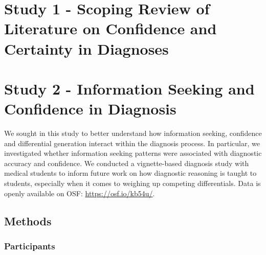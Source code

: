 \documentclass[a4paper, nobind]{templates/ociamthesis}
\begin{document}
\hypertarget{study-1---scoping-review-of-literature-on-confidence-and-certainty-in-diagnoses}{%
\chapter*{Study 1 - Scoping Review of Literature on Confidence and Certainty in Diagnoses}\label{study-1---scoping-review-of-literature-on-confidence-and-certainty-in-diagnoses}}

\adjustmtc
{}

\hypertarget{study-2---information-seeking-and-confidence-in-diagnosis}{%
\chapter*{Study 2 - Information Seeking and Confidence in Diagnosis}\label{study-2---information-seeking-and-confidence-in-diagnosis}}

\adjustmtc
{}

We sought in this study to better understand how information seeking, confidence and differential generation interact within the diagnosis process. In particular, we investigated whether information seeking patterns were associated with diagnostic accuracy and confidence. We conducted a vignette-based diagnosis study with medical students to inform future work on how diagnostic reasoning is taught to students, especially when it comes to weighing up competing differentials. Data is openly available on OSF: \url{https://osf.io/kb54u/}.

\hypertarget{methods}{%
\section*{Methods}\label{methods}}

\hypertarget{participants}{%
\subsection*{Participants}\label{participants}}
\end{document}
